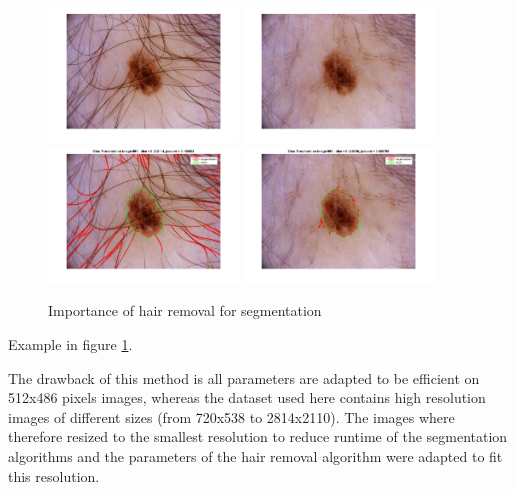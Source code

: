 \documentclass[a4paper,10pt]{article}
\begin{document}
\begin{figure}
	\centering
	\includegraphics[width=0.45\textwidth]{../results/hair-removal/im_095} 
	\includegraphics[width=0.45\textwidth]{../results/hair-removal/imshaved_095} \\
	\includegraphics[width=0.45\textwidth]{../results/hair-removal/otsu_segt_im_095} 
	\includegraphics[width=0.45\textwidth]{../results/hair-removal/otsu_segt_shaved_im_095}
	\caption{Importance of hair removal for segmentation}
	\label{fig:dullrazor}
\end{figure}

Example in figure \ref{fig:dullrazor}.

The drawback of this method is all parameters are adapted to be efficient on 512x486 pixels images, whereas the dataset used here contains high resolution images of different sizes (from 720x538 to 2814x2110). The images where therefore resized to the smallest resolution to reduce runtime of the segmentation algorithms and the parameters of the hair removal algorithm were adapted to fit this resolution.
\end{document}
